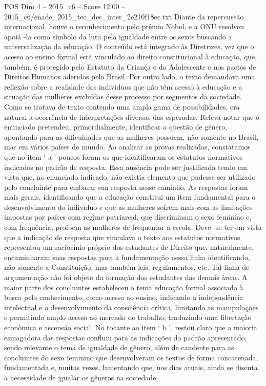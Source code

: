\begin{textsample}{POS Dim 4 – 2015\_c6 – Score 12.00 – 2015\_c6/enade\_2015\_tec\_des\_inter\_2e210f18ec.txt}
Diante da repercussão internacional, houve o reconhecimento pelo prêmio Nobel, e a ONU resolveu apoiá -la como símbolo da luta pela igualdade entre os sexos buscando a universalização da educação.
O conteúdo está integrado às Diretrizes, vez que o acesso ao ensino formal está vinculado ao direito constitucional à educação, que, também, é protegido pelo Estatuto da Criança e do Adolescente e nos pactos de Direitos Humanos aderidos pelo Brasil.
Por outro lado, o texto demandava uma reflexão sobre a realidade dos indivíduos que não têm acesso à educação e a situação das mulheres excluídas desse processo por segmentos da sociedade.
Como se tratava de texto contendo uma ampla gama de possibilidades, era natural a ocorrência de interpretações diversas das esperadas.
Releva notar que o enunciado pretendeu, primordialmente, identificar a questão de gênero, apontando para as dificuldades que as mulheres possuem, não somente no Brasil, mas em vários países do mundo.
Ao analisar as provas realizadas, constatamos que no item ‘ a ’ poucos foram os que identificaram os estatutos normativos indicados no padrão de resposta.
Essa ausência pode ser justificada tendo em vista que, no enunciado indicado, não existia elemento que pudesse ser utilizado pelo concluinte para embasar sua resposta nesse caminho.
As respostas foram mais gerais, identificando que a educação constitui um item fundamental para o desenvolvimento do indivíduo e que as mulheres sofrem mais com as limitações impostas por países com regime patriarcal, que discriminam o sexo feminino e, com frequência, proíbem as mulheres de frequentar a escola.
Deve -se ter em vista que a indicação de resposta que vinculava o texto aos estatutos normativos representou um raciocínio próprio dos estudantes de Direito que, naturalmente, encaminharam suas respostas para a fundamentação nessa linha identificando, não somente a Constituição, mas também leis, regulamentos, etc.
Tal linha de argumentação não foi objeto da formação dos estudantes das demais áreas.
A maior parte dos concluintes estabeleceu o tema educação formal associado à busca pelo conhecimento, como acesso ao ensino, indicando a independência intelectual e o desenvolvimento da consciência crítica, limitando as manipulações e permitindo amplo acesso ao mercado de trabalho, traduzindo uma libertação econômica e ascensão social.
No tocante ao item ‘ b ’, restou claro que a maioria esmagadora das respostas confluiu para as indicações do padrão apresentado, sendo relevante o tema de igualdade de gênero, além de candente para as concluintes do sexo feminino que desenvolveram os textos de forma concatenada, fundamentada e, muitas vezes, lamentando que, nos dias atuais, ainda se discuta a necessidade de igualar os gêneros na sociedade.

\end{textsample}
